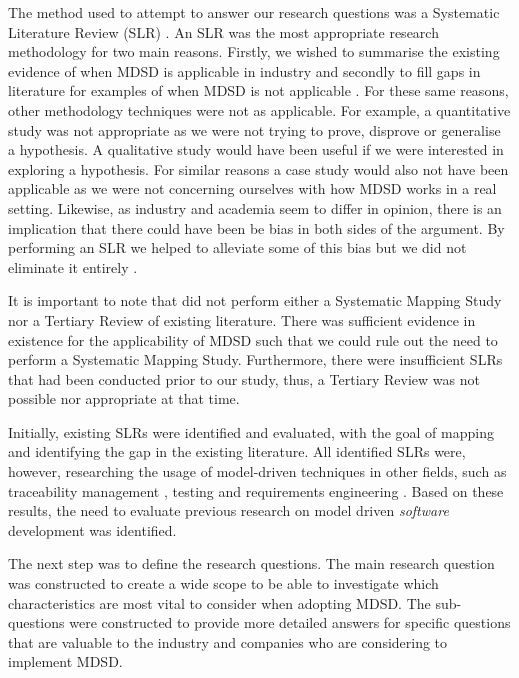 \documentclass[10pt,twocolumn]{article}
\begin{document}
The method used to attempt to answer our research questions was a Systematic Literature Review (SLR) \cite{kitchenham2007guidelines}. An SLR was the most appropriate research methodology for two main reasons. Firstly, we wished to summarise the existing evidence of when MDSD is applicable in industry and secondly to fill gaps in literature for examples of when MDSD is not applicable \cite{kitchenham2007guidelines}. For these same reasons, other methodology techniques were not as applicable. For example, a quantitative study was not appropriate as we were not trying to prove, disprove or generalise a hypothesis. A qualitative study would have been useful if we were interested in exploring a hypothesis. For similar reasons a case study would also not have been applicable as we were not concerning ourselves with how MDSD works in a real setting. Likewise, as industry and academia seem to differ in opinion, there is an implication that there could have been be bias in both sides of the argument. By performing an SLR we helped to alleviate some of this bias but we did not eliminate it entirely \cite{kitchenham2007guidelines}.

It is important to note that did not perform either a Systematic Mapping Study nor a Tertiary Review of existing literature. There was sufficient evidence in existence for the applicability of MDSD such that we could rule out the need to perform a Systematic Mapping Study. Furthermore, there were insufficient SLRs that had been conducted prior to our study, thus, a Tertiary Review was not possible nor appropriate at that time.


Initially, existing SLRs were identified and evaluated, with the goal of mapping and identifying the gap in the existing literature. All identified SLRs \cite{santiago2012model} \cite{dias2007survey} \cite{loniewski2010systematic} \cite{nicolas2009generation} were, however, researching the usage of model-driven techniques in other fields, such as traceability management \cite{santiago2012model}, testing \cite{dias2007survey} and requirements engineering \cite{loniewski2010systematic} \cite{nicolas2009generation}. Based on these results, the need to evaluate previous research on model driven \textit{software} development was identified. 

The next step was to define the research questions. The main research question was constructed to create a wide scope to be able to investigate which characteristics are most vital to consider when adopting MDSD. The sub-questions were constructed to provide more detailed answers for specific questions that are valuable to the industry and companies who are considering to implement MDSD. 
\end{document}
